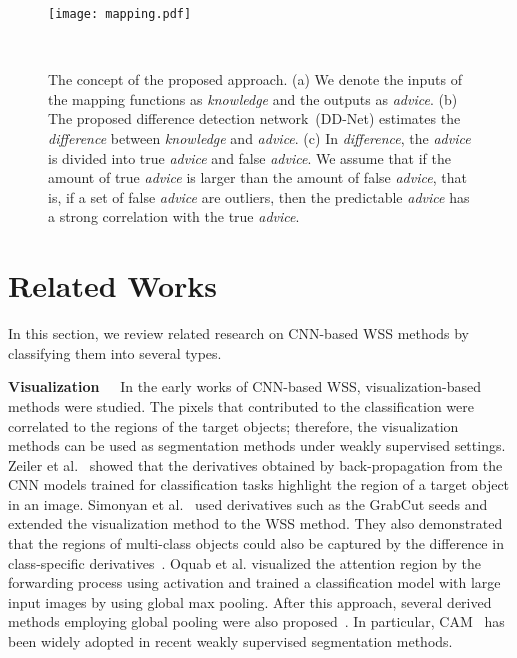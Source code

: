 \documentclass[10pt,twocolumn,letterpaper]{article}
\begin{document}
\begin{figure*}[tb]
\begin{center}
\texttt{[image: mapping.pdf]}
\caption{The concept of the proposed approach.
(a) We denote the inputs of the mapping functions as {\it knowledge} and the outputs as {\it advice}.
(b) The proposed difference detection network~(DD-Net) estimates the {\it difference} between {\it knowledge} and {\it advice}.
(c) In {\it difference}, the {\it advice} is divided into true {\it advice} and false {\it advice}. We assume that if the amount of true {\it advice} is larger than the amount of false {\it advice}, that is, if a set of false {\it advice} are outliers, then the predictable {\it advice} has a strong correlation with the true {\it advice}.
} \label{mapping_fig}
\vskip -8mm~
\end{center}
\end{figure*}
\section{Related Works}
In this section, we review related research on CNN-based WSS methods by classifying them into several types.

\noindent
{\bf Visualization~~}
In the early works of CNN-based WSS, visualization-based methods were studied.
The pixels that contributed to the classification were correlated to the regions of the target objects; therefore, the visualization methods can be used as segmentation methods under weakly supervised settings.
Zeiler et al.~\cite{zei14} showed that the derivatives obtained 
by back-propagation from the CNN models trained for classification tasks
highlight the region of a target object in an image.
Simonyan et al.~\cite{sim14} used derivatives such as the GrabCut seeds and
extended the visualization method to the WSS method.
They also demonstrated that the regions of multi-class objects could also be captured 
by the difference in class-specific derivatives~\cite{backprop,dcsm}.
Oquab et al.\cite{oqu14} visualized the attention region by the forwarding process using activation and trained a classification model with large input images by using global max pooling.
After this approach, several derived methods employing global pooling were also
proposed~\cite{ped15,gap,sec}.
In particular, CAM~\cite{gap} has been widely adopted in recent weakly supervised segmentation methods.
\end{document}
